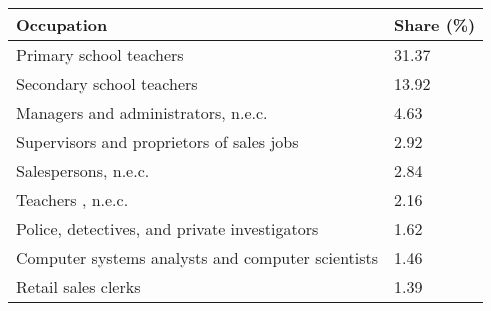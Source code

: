 

\begin{tabular}[t]{ll}
\toprule
Occupation & Share (\%)\\
\midrule
Primary school teachers & 31.37\\
Secondary school teachers & 13.92\\
Managers and administrators, n.e.c. & 4.63\\
Supervisors and proprietors of sales jobs & 2.92\\
Salespersons, n.e.c. & 2.84\\
Teachers , n.e.c. & 2.16\\
Police, detectives, and private investigators & 1.62\\
Computer systems analysts and computer scientists & 1.46\\
Retail sales clerks & 1.39\\
\bottomrule
\end{tabular}

